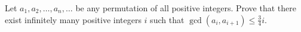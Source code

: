 \documentclass{subfile}
\begin{document}


	\begin{problem}
		Let $a_1,a_2,\ldots,a_n,\ldots$ be any permutation of all positive integers. Prove that there exist infinitely many positive integers $i$ such that $\gcd(a_i,a_{i+1})\leq \frac{3}{4} i$. %
	\end{problem}
\end{document}

